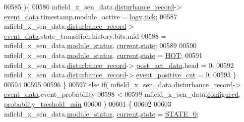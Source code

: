 \begin{DoxyCode}
00585                           )\{
00586                                  mfield\_x\_sen\_data.\hyperlink{a00025_ac9b38e2c1d3f1013a88d33506c754152}{disturbance\_record}->
      \hyperlink{a00028_a8c0bda69e71ef674e60da47ad0be9ab0}{event\_data}.timestamp.module\_active = \hyperlink{a00021_a2e89c46668b39a17753c238950c9e1ec}{logv}.\hyperlink{a00021_a81f0ce68c2c483fb8df726cc1988d8e8}{tick};
00587                                  mfield\_x\_sen\_data.\hyperlink{a00025_ac9b38e2c1d3f1013a88d33506c754152}{disturbance\_record}->
      \hyperlink{a00028_a8c0bda69e71ef674e60da47ad0be9ab0}{event\_data}.state\_transition.history.bits.mid
00588                                  = mfield\_x\_sen\_data.\hyperlink{a00025_adfab5a5d8b45a93dfb13edb24e2b80e3}{module\_status}.
      \hyperlink{a00019_acf41ffc11da291c2f9f0fcb02ee72b98}{current}.\hyperlink{a00019_a6b8d8e916bc56265a3fd279bd26b6d1b}{state};
00589 
00590                                  mfield\_x\_sen\_data.\hyperlink{a00025_adfab5a5d8b45a93dfb13edb24e2b80e3}{module\_status}.
      \hyperlink{a00019_acf41ffc11da291c2f9f0fcb02ee72b98}{current}.\hyperlink{a00019_a6b8d8e916bc56265a3fd279bd26b6d1b}{state} = \hyperlink{a00021_a1eb14cc432874ddacd1934791dbe12a3}{HOT};
00591                                  mfield\_x\_sen\_data.\hyperlink{a00025_ac9b38e2c1d3f1013a88d33506c754152}{disturbance\_record}->
      \hyperlink{a00028_a9c699c0cc82d0baa6e49195f185ab34f}{post\_act\_data}.head = 0;
00592                                  mfield\_x\_sen\_data.\hyperlink{a00025_ac9b38e2c1d3f1013a88d33506c754152}{disturbance\_record}->
      \hyperlink{a00028_a7397b9d76d4b57500f27bb23d258a18a}{event\_positive\_cnt} = 0;
00593                            \}
00594 
00595 
00596                    \}
00597                    \textcolor{keywordflow}{else} \textcolor{keywordflow}{if}( mfield\_x\_sen\_data.\hyperlink{a00025_ac9b38e2c1d3f1013a88d33506c754152}{disturbance\_record}->
      \hyperlink{a00028_a8c0bda69e71ef674e60da47ad0be9ab0}{event\_data}.event\_probability
00598                             <
00599                            mfield\_x\_sen\_data.\hyperlink{a00025_a94b2d1f6ea4ab334c74d24984dd27843}{configured}.
      \hyperlink{a00021_aa59261f74183d4f9e909ac425e0bea35}{probablity\_treshold\_min}
00600                            )
00601                          \{
00602 
00603                              mfield\_x\_sen\_data.\hyperlink{a00025_adfab5a5d8b45a93dfb13edb24e2b80e3}{module\_status}.
      \hyperlink{a00019_acf41ffc11da291c2f9f0fcb02ee72b98}{current}.\hyperlink{a00019_a6b8d8e916bc56265a3fd279bd26b6d1b}{state} = \hyperlink{a00021_ad6739dbbe5581cac99b7dc8a5e09949c}{STATE\_0};

\end{DoxyCode}
